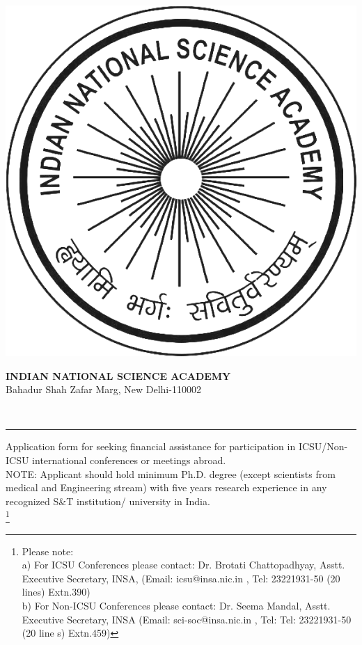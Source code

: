 \documentclass[12pt,a4paper]{article}
\begin{document}
\begin{minipage}{.15\textwidth}
	\includegraphics[scale=.5]{insa_logo_bnw.png} 
\end{minipage}
\begin{minipage}{.84\textwidth}
	\center
	\Large
	\textbf{
	INDIAN NATIONAL SCIENCE ACADEMY}\\
	Bahadur Shah Zafar Marg, New Delhi-110002
\end{minipage}\\[1em]
\hrule
\vspace{2em}
%
%
\noindent
Application form for seeking financial assistance for 
participation in ICSU/Non-ICSU international conferences 
or meetings abroad.\\[1em]
%
%
NOTE: Applicant should hold minimum Ph.D. degree 
(except scientists from medical and Engineering stream) 
with five years research experience in any recognized 
S\&T institution/ university in India.\\[1em]
%
%
\let\thefootnote\relax\footnote{
Please note:
\\
a) For ICSU Conferences please contact: Dr. Brotati Chattopadhyay, Asstt. Executive
Secretary, INSA, (Email: icsu@insa.nic.in , Tel: 23221931-50 (20 lines) Extn.390)
\\
b)  For Non-ICSU Conferences please  contact: Dr. Seema Mandal, Asstt. Executive
Secretary, INSA (Email: sci-soc@insa.nic.in , Tel: Tel: 23221931-50 (20 line s) Extn.459)
}
%
%
\end{document}
